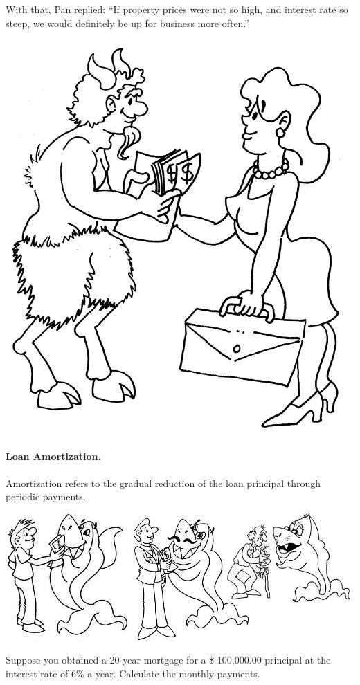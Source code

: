 \documentclass[a4paper,12pt]{book}
\begin{document}
With that, Pan replied: “If property prices
were not so high, and interest rate so steep,
we would definitely be up for business more often.”

\includegraphics[scale=0.5]{figs-prefix/deuspan.jpg}

\paragraph{Loan Amortization.}
Amortization refers to the gradual reduction
of the loan principal through periodic payments.

\includegraphics{figs-prefix/agingshark.jpg}

Suppose you obtained a 20-year mortgage
for a \$ 100,000.00 principal at the interest
rate of 6\% a year. Calculate the monthly payments.
\end{document}
